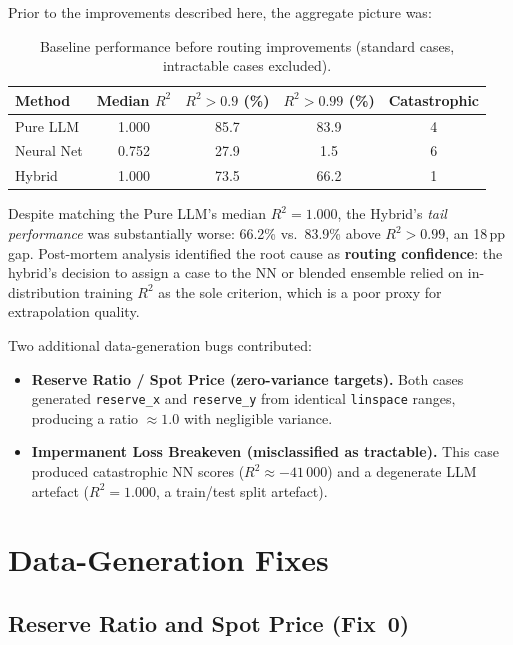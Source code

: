 \documentclass[11pt,a4paper]{article}
\begin{document}
Prior to the improvements described here, the aggregate picture was:

\begin{table}[h]
\centering
\caption{Baseline performance before routing improvements (standard cases,
         intractable cases excluded).}
\label{tab:baseline}
\begin{tabular}{lcccc}
\toprule
Method & Median $R^2$ & $R^2 > 0.9$ (\%) & $R^2 > 0.99$ (\%) & Catastrophic \\
\midrule
Pure LLM    & 1.000 & 85.7 & 83.9 & 4 \\
Neural Net  & 0.752 & 27.9 &  1.5 & 6 \\
Hybrid      & 1.000 & 73.5 & 66.2 & 1 \\
\bottomrule
\end{tabular}
\end{table}

Despite matching the Pure LLM's median $R^2 = 1.000$, the Hybrid's
\emph{tail performance} was substantially worse: 66.2\% vs.\ 83.9\% above
$R^2 > 0.99$, an 18\,pp gap.  Post-mortem analysis identified the root cause
as \textbf{routing confidence}: the hybrid's decision to assign a case to the
NN or blended ensemble relied on in-distribution training $R^2$ as the sole
criterion, which is a poor proxy for extrapolation quality.

Two additional data-generation bugs contributed:

\begin{itemize}[leftmargin=*]
  \item \textbf{Reserve Ratio / Spot Price (zero-variance targets).}
    Both cases generated \texttt{reserve\_x} and \texttt{reserve\_y} from
    identical \texttt{linspace} ranges, producing a ratio $\approx 1.0$ with
    negligible variance.
  \item \textbf{Impermanent Loss Breakeven (misclassified as tractable).}
    This case produced catastrophic NN scores ($R^2 \approx -41\,000$) and a
    degenerate LLM artefact ($R^2 = 1.000$, a train/test split artefact).
\end{itemize}

\section{Data-Generation Fixes}
\label{sec:data_fixes}

\subsection{Reserve Ratio and Spot Price (Fix~0)}
\end{document}
